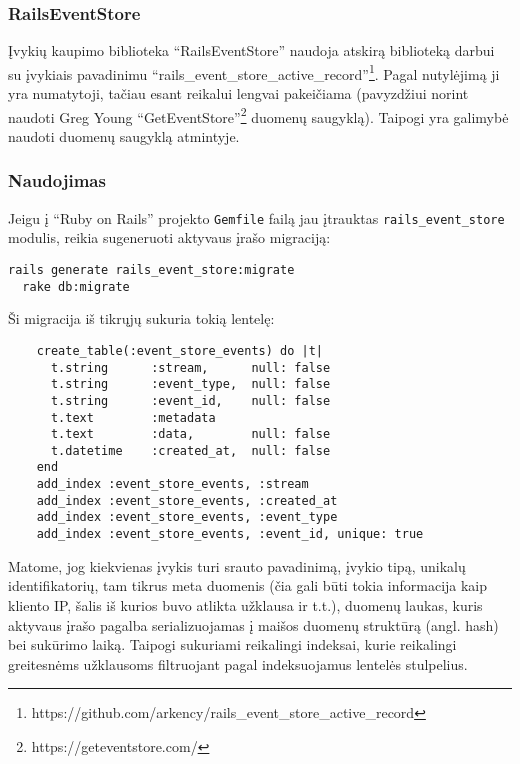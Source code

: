 \subsubsection{RailsEventStore}

Įvykių kaupimo biblioteka ``RailsEventStore'' naudoja atskirą biblioteką darbui su įvykiais pavadinimu ``rails\_event\_store\_active\_record''\footnote{https://github.com/arkency/rails\_event\_store\_active\_record}. Pagal nutylėjimą ji yra numatytoji, tačiau esant reikalui lengvai pakeičiama (pavyzdžiui norint naudoti Greg Young ``GetEventStore''\footnote{https://geteventstore.com/} duomenų saugyklą). Taipogi yra galimybė naudoti duomenų saugyklą atmintyje.

\subsubsection{Naudojimas}

Jeigu į ``Ruby on Rails'' projekto \lstinline|Gemfile| failą jau įtrauktas \lstinline|rails_event_store| modulis, reikia sugeneruoti aktyvaus įrašo migraciją:

\begin{lstlisting}[]
  rails generate rails_event_store:migrate
  rake db:migrate
\end{lstlisting}

Ši migracija iš tikrųjų sukuria tokią lentelę:

\begin{lstlisting}
    create_table(:event_store_events) do |t|
      t.string      :stream,      null: false
      t.string      :event_type,  null: false
      t.string      :event_id,    null: false
      t.text        :metadata
      t.text        :data,        null: false
      t.datetime    :created_at,  null: false
    end
    add_index :event_store_events, :stream
    add_index :event_store_events, :created_at
    add_index :event_store_events, :event_type
    add_index :event_store_events, :event_id, unique: true
\end{lstlisting}

Matome, jog kiekvienas įvykis turi srauto pavadinimą, įvykio tipą, unikalų identifikatorių, tam tikrus meta duomenis (čia gali būti tokia informacija kaip kliento IP, šalis iš kurios buvo atlikta užklausa ir t.t.), duomenų laukas, kuris aktyvaus įrašo pagalba serializuojamas į maišos duomenų struktūrą (angl. hash) bei sukūrimo laiką. Taipogi sukuriami reikalingi indeksai, kurie reikalingi greitesnėms užklausoms filtruojant pagal indeksuojamus lentelės stulpelius.

